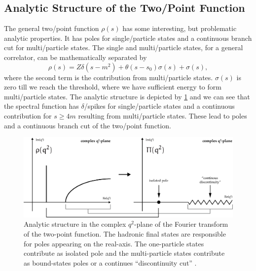 \documentclass[../../index.tex]{subfiles}
\begin{document}
\subsection{Analytic Structure of the Two\-/Point Function}
The general two\-/point function $\rho(s)$ has some interesting, but problematic
analytic properties. It has poles for single\-/particle states and a continuous
branch cut for multi\-/particle states. The single and multi\-/particle states,
for a general correlator, can be mathematically separated by
\begin{equation}
  \rho(s) = Z \delta(s-m^2) + \theta(s-s_0)\sigma(s)
  + \sigma(s),
\end{equation}
where the second term is the contribution from multi\-/particle states.
\(\sigma(s)\) is zero till we reach the threshold, where we have sufficient
energy to form multi\-/particle states. The analytic structure is depicted by
\cref{fig:analyticStructureCorrelator} and we can see that the spectral function
has \(\delta\)\-/spikes for single\-/particle states and a continuous
contribution for \(s\geq 4m\) resulting from multi\-/particle states. These lead
to poles and a continuous branch cut of the two\-/point function.
\begin{figure}
  \centering
  \includegraphics[width=\textwidth]{./images/analyticStructureCorrelator.eps}
  \caption{Analytic structure in the complex $q^2$-plane of the Fourier
    transform of the two-point function. The hadronic final states are
    responsible for poles appearing on the real-axis. The one-particle states
    contribute as isolated pole and the multi-particle states contribute as
    bound-states poles or a continues ``discontinuity cut''
    \cite{Peskin1995,Zwicky2016}.}
  \label{fig:analyticStructureCorrelator}
\end{figure}
\end{document}
